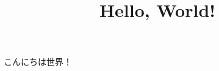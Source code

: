 \documentclass[uplatex]{jsarticle}
\title{Hello, World!}
\date{}
\begin{document}
\maketitle

こんにちは世界！\cite{helloworld}



\end{document}
